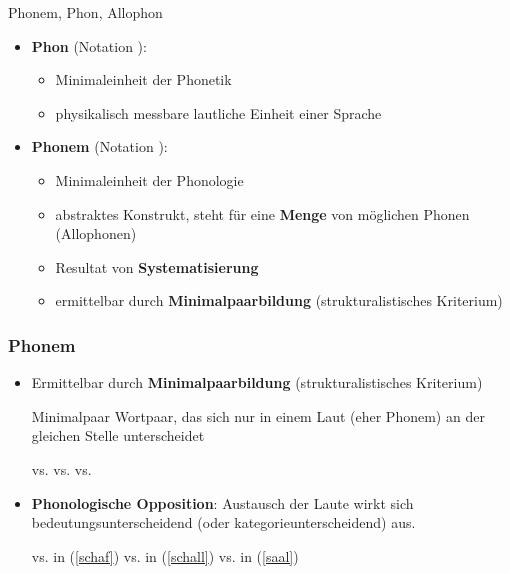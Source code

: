 \begin{frame}{Phonem, Phon, Allophon}

\begin{itemize}
	\item \textbf{Phon} (Notation \textipa{[ ]}):
	
	\begin{itemize}
		\item Minimaleinheit der Phonetik
		\item physikalisch messbare lautliche Einheit einer Sprache
	\end{itemize}
	
	\item \textbf{Phonem} (Notation \textipa{/ /}):
	
	\begin{itemize}
		\item Minimaleinheit der Phonologie
		\item abstraktes Konstrukt, steht für eine \textbf{Menge} von möglichen Phonen (Allophonen)
		\item Resultat von \textbf{Systematisierung}
		\item ermittelbar durch \textbf{Minimalpaarbildung} (strukturalistisches Kriterium)	
	\end{itemize}
	
\end{itemize}

\end{frame}


\begin{frame}
\frametitle{Phonem}

	\begin{itemize}
	
		\item Ermittelbar durch \textbf{Minimalpaarbildung} (strukturalistisches Kriterium)
		
		\begin{block}{Minimalpaar}
			Wortpaar, das sich nur in einem Laut (eher Phonem) an der gleichen Stelle unterscheidet
		\end{block}
	
	\eal
		\ex \label{schaf} \textipa{[Sa:l]}   vs. \textipa{[Sa:f]}  \ras {} \vs {}
		\ex\label{schall} \textipa{[Sa:l]}  vs. \textipa{[Sal]}  \ras {} \vs {}
		\ex \label{saal} \textipa{[Sa:l]}  vs. \textipa{[za:l]}  \ras {} \vs {}
	\zl
	
		\item \textbf{Phonologische Opposition}: Austausch der Laute wirkt sich bedeutungsunterscheidend (oder kategorieunterscheidend) aus.
	
	\eal
		\ex {} vs.  in (\ref{schaf})
		\ex {} vs.  in (\ref{schall})
		\ex {} vs.  in (\ref{saal})
	\zl			
	
	\end{itemize}

\end{frame}


